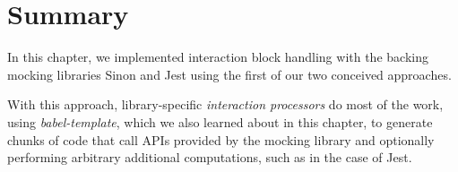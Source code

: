 \section{Summary}
In this chapter,
we implemented interaction block handling
with the backing mocking libraries Sinon and Jest
using the first of our two conceived approaches.

With this approach,
library-specific \textit{interaction processors} do most of the work,
using \textit{babel-template},
which we also learned about in this chapter,
to generate chunks of code
that call APIs provided by the mocking library
and optionally performing arbitrary additional computations,
such as in the case of Jest.
